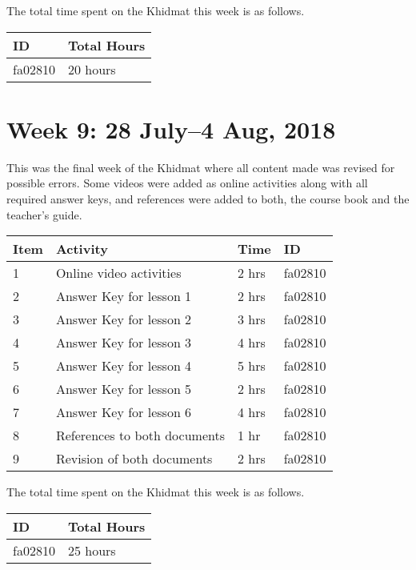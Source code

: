 \documentclass{article}
\begin{document}
The total time spent on the Khidmat this week is as follows. \newline

\begin{tabular}{|l|l|}
  \hline
  ID & Total Hours\\\hline\hline
  fa02810 & 20 hours\\\hline
\end{tabular}

\newpage %
\section*{Week 9: 28 July--4 Aug, 2018}

This was the final week of the Khidmat where all content made was revised for possible errors. Some videos were added as online activities along with all required answer keys, and references were added to both, the course book and the teacher's guide. \newline

\begin{tabular}{|l|l|l|l|}
  \hline
  Item 	& Activity & Time & ID \\\hline\hline
  1	& Online video activities & 2 hrs & fa02810 \\\hline
  2	& Answer Key for lesson 1 & 2 hrs & fa02810 \\\hline
  3 & Answer Key for lesson 2 & 3 hrs & fa02810 \\\hline
  4 & Answer Key for lesson 3 & 4 hrs & fa02810 \\\hline
  5 & Answer Key for lesson 4 & 5 hrs & fa02810 \\\hline
  6 & Answer Key for lesson 5 & 2 hrs & fa02810 \\\hline
  7 & Answer Key for lesson 6 & 4 hrs & fa02810 \\\hline
  8 & References to both documents & 1 hr & fa02810 \\\hline
  9 & Revision of both documents & 2 hrs & fa02810 \\\hline
\end{tabular} \newline

The total time spent on the Khidmat this week is as follows. \newline

\begin{tabular}{|l|l|}
  \hline
  ID & Total Hours\\\hline\hline
  fa02810 & 25 hours\\\hline
\end{tabular}
\end{document}
